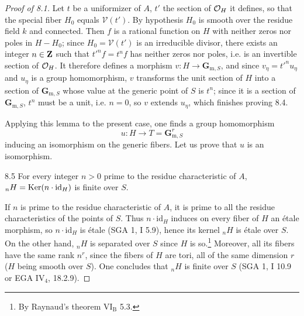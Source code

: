 \begin{proof}[Proof of 8.1]
Let $t$ be a uniformizer of $A$, $t'$ the section of $\mathcal{O}_H$ it defines, so that the special fiber $H_0$ equals $\mathcal V(t')$. By hypothesis $H_0$ is smooth over the residue field $k$ and connected. Then $f$ is a rational function on $H$ with neither zeros nor poles in $H-H_0$; since $H_0=\mathcal V(t')$ is an irreducible divisor, there exists an integer $n\in\mathbf{Z}$ such that $t'^n f=t^n f$ has neither zeros nor poles, i.e. is an invertible section of $\mathcal{O}_H$. It therefore defines a morphism $v:H\to\mathbf{G}_{\mathrm{m},S}$, and since $v_\eta=t'^n u_\eta$ and $u_\eta$ is a group homomorphism, $v$ transforms the unit section of $H$ into a section of $\mathbf{G}_{\mathrm{m},S}$ whose value at the generic point of $S$ is $t^n$; since it is a section of $\mathbf{G}_{\mathrm{m},S}$, $t^n$ must be a unit, i.e. $n=0$, so $v$ extends $u_\eta$, which finishes proving 8.4.

Applying this lemma to the present case, one finds a group homomorphism
\[
u:H\to T=\mathbf{G}_{\mathrm{m},S}^r
\]
inducing an isomorphism on the generic fibers. Let us prove that $u$ is an isomorphism.
\begin{lemma}{8.5}\label{X.8.5}
For every integer $n>0$ prime to the residue characteristic of $A$, ${}_nH=\operatorname{Ker}(n\cdot\mathrm{id}_H)$ is finite over $S$.
\end{lemma}
If $n$ is prime to the residue characteristic of $A$, it is prime to all the residue characteristics of the points of $S$. Thus $n\cdot\mathrm{id}_H$ induces on every fiber of $H$ an étale morphism, so $n\cdot\mathrm{id}_H$ is étale (SGA 1, I 5.9), hence its kernel ${}_nH$ is étale over $S$. On the other hand, ${}_nH$ is separated over $S$ since $H$ is so.\footnote{By Raynaud's theorem VI$_{\mathrm B}$ 5.3.} Moreover, all its fibers have the same rank $n^r$, since the fibers of $H$ are tori, all of the same dimension $r$ ($H$ being smooth over $S$). One concludes that ${}_nH$ is finite over $S$ (SGA 1, I 10.9 or EGA IV$_4$, 18.2.9).


\end{proof}
